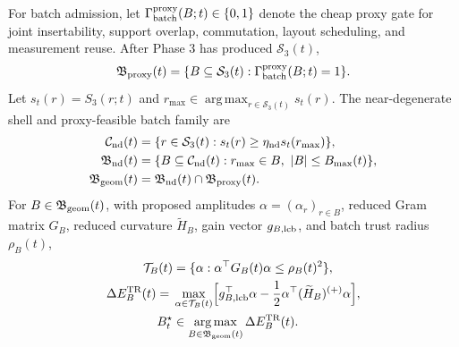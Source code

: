 \documentclass[
  reprint,
  amsmath,
  amssymb,
  aps,
  pra,
  nofootinbib,
  superscriptaddress,
  floatfix
]{revtex4-2}
\newcommand{\Sset}{\mathcal{S}}
\newcommand{\TR}{\mathrm{TR}}
\newcommand{\argmaxp}{\mathop{\mathrm{arg\,max}}}
\begin{document}
For batch admission, let $\Gamma_{\rm batch}^{\rm proxy}(B;t)\in\{0,1\}$ denote the cheap proxy gate for joint insertability, support overlap, commutation, layout scheduling, and measurement reuse. After Phase 3 has produced $\Sset_3(t)$,
\begin{equation}
\mathfrak B_{\rm proxy}(t)=
\{B\subseteq\Sset_3(t):\Gamma_{\rm batch}^{\rm proxy}(B;t)=1\}.
\label{eq:batch_proxy_screen}
\end{equation}
Let $s_t(r)=S_3(r;t)$ and $r_{\max}\in\argmaxp_{r\in\Sset_3(t)}s_t(r)$. The near-degenerate shell and proxy-feasible batch family are
\begin{equation}
\begin{aligned}
\mathcal C_{\rm nd}(t)
&=\{r\in\Sset_3(t):s_t(r)\ge \eta_{\rm nd}s_t(r_{\max})\},\\
\mathfrak B_{\rm nd}(t)
&=\{B\subseteq\mathcal C_{\rm nd}(t):r_{\max}\in B,\ |B|\le B_{\max}(t)\},\\
\mathfrak B_{\rm geom}(t)
&=\mathfrak B_{\rm nd}(t)\cap\mathfrak B_{\rm proxy}(t).
\end{aligned}
\label{eq:near_degenerate_shell}
\end{equation}
For $B\in\mathfrak B_{\rm geom}(t)$, with proposed amplitudes $\alpha=(\alpha_r)_{r\in B}$, reduced Gram matrix $G_B$, reduced curvature $\widetilde H_B$, gain vector $g_{B,\rm lcb}$, and batch trust radius $\rho_B(t)$,
\begin{equation}
\begin{aligned}
\mathcal T_B(t)&=\{\alpha:\alpha^{\top}G_B(t)\alpha\le \rho_B(t)^2\},\\
\Delta E_B^{\TR}(t)={}&\max_{\alpha\in\mathcal T_B(t)}
\Bigl[g_{B,\rm lcb}^{\top}\alpha
-\frac12\alpha^{\top}(\widetilde H_B)^{(+)}\alpha\Bigr],\\
B_t^{\star}&\in\argmaxp_{B\in\mathfrak B_{\rm geom}(t)}\Delta E_B^{\TR}(t).
\end{aligned}
\label{eq:batch_gain}
\end{equation}
\end{document}
